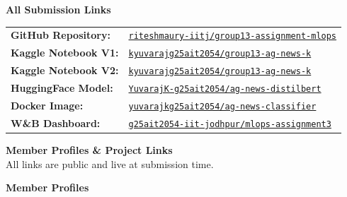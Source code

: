 \documentclass[11pt,a4paper]{article}
\begin{document}
\begin{titlepage}
\textbf{\large All Submission Links}\\[0.4cm]
\renewcommand{\arraystretch}{1.5}
\begin{tabular}{ll}
\textbf{GitHub Repository:} & \href{https://github.com/riteshmaury-iitj/group13-assignment-mlops}{\texttt{riteshmaury-iitj/group13-assignment-mlops}} \\
\textbf{Kaggle Notebook V1:} & \href{https://www.kaggle.com/code/kyuvarajg25ait2054/group13-ag-news-k}{\texttt{kyuvarajg25ait2054/group13-ag-news-k}} \\
\textbf{Kaggle Notebook V2:} & \href{https://www.kaggle.com/code/kyuvarajg25ait2054/group13-ag-news-k}{\texttt{kyuvarajg25ait2054/group13-ag-news-k}} \\
\textbf{HuggingFace Model:} & \href{https://huggingface.co/YuvarajK-g25ait2054/ag-news-distilbert}{\texttt{YuvarajK-g25ait2054/ag-news-distilbert}} \\
\textbf{Docker Image:}      & \href{https://hub.docker.com/r/yuvarajkg25ait2054/ag-news-classifier}{\texttt{yuvarajkg25ait2054/ag-news-classifier}} \\
\textbf{W\&B Dashboard:}    & \href{https://wandb.ai/g25ait2054-iit-jodhpur/mlops-assignment3}{\texttt{g25ait2054-iit-jodhpur/mlops-assignment3}} \\
\end{tabular}

\end{titlepage}

\thispagestyle{fancy}

\begin{center}
{\large\bfseries\color{darkblue} Member Profiles \& Project Links}\\[0.2cm]
{\small All links are public and live at submission time.}
\end{center}

\vspace{0.4cm}

{\bfseries\color{darkgreen} Member Profiles}
\end{document}
